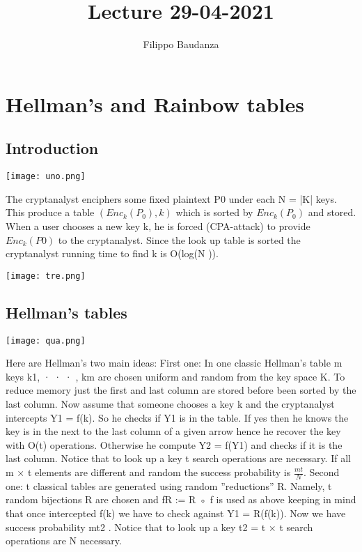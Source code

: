 \documentclass{article}
\title{Lecture 29-04-2021}
\author{Filippo Baudanza}
\begin{document}
\maketitle

\section{Hellman’s and Rainbow tables}
\subsection{Introduction}
\begin{center}
\texttt{[image: uno.png]}
\end{center}
  

The cryptanalyst enciphers some fixed plaintext P0 under each N = |K| keys. This produce a table $(Enc_k(P_0),k)$ which is sorted by $Enc_k(P_0)$ and stored.
When a user chooses a new key k, he is forced (CPA-attack) to provide $Enc_k(P0)$ to the cryptanalyst. Since the look up table is sorted the cryptanalyst running time to find k is O(log(N )).

\begin{center}
\texttt{[image: tre.png]}
\end{center}
\subsection{Hellman's tables}
\begin{center}
\texttt{[image: qua.png]}
\end{center}
  Here are Hellman’s two main ideas:
First one: In one classic Hellman’s table m keys k1, · · · , km are chosen uniform and random from the key space K. To reduce memory just the first and last column are stored before been sorted by the last column.
Now assume that someone chooses a key k and the cryptanalyst intercepts Y1 = f(k).
So he checks if Y1 is in the table. If yes then he knows the key is in the next to the last column of
a given arrow hence he recover the key with O(t) operations.
Otherwise he compute Y2 = f(Y1) and checks if it is the last column.
Notice that to look up a key t search operations are necessary. If all m × t elements are different
and random the success probability is $ \frac{mt}{N} $.
Second one: t classical tables are generated using random ”reductions” R. Namely, t random bijections R are chosen and fR := R ◦ f is used as above keeping in mind that once intercepted f(k) we have to check against Y1 = R(f(k)).
Now we have success probability mt2 . Notice that to look up a key t2 = t × t search operations are N
necessary.
\end{document}
